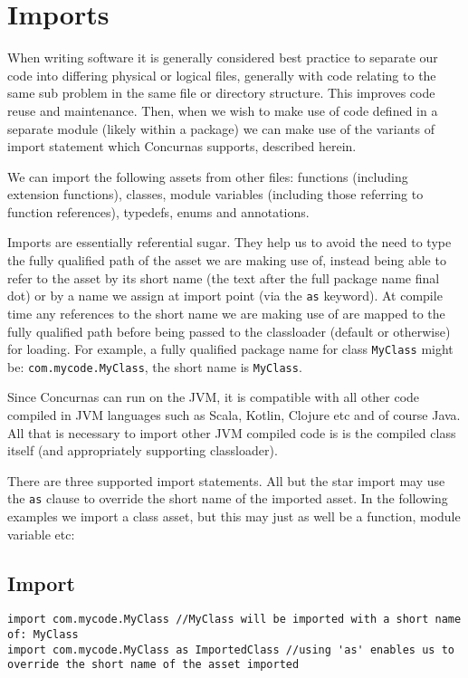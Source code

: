 \documentclass[conc-doc]{subfiles}
\begin{document}
	\chapter[Imports]{Imports}
	\label{chap:imports}

When writing software it is generally considered best practice to separate our code into differing physical or logical files, generally with code relating to the same sub problem in the same file or directory structure. This improves code reuse and maintenance. Then, when we wish to make use of code defined in a separate module (likely within a package) we can make use of the variants of import statement which Concurnas supports, described herein.

We can import the following assets from other files: functions (including extension functions), classes, module variables (including those referring to function references), typedefs, enums and annotations.

Imports are essentially referential sugar. They help us to avoid the need to type the fully qualified path of the asset we are making use of, instead being able to refer to the asset by its short name (the text after the full package name final dot) or by a name we assign at import point (via the \lstinline{as} keyword). At compile time any references to the short name we are making use of are mapped to the fully qualified path before being passed to the classloader (default or otherwise) for loading. For example, a fully qualified package name for class \lstinline{MyClass} might be: \lstinline{com.mycode.MyClass}, the short name is \lstinline{MyClass}.

Since Concurnas can run on the JVM, it is compatible with all other code compiled in JVM languages such as Scala, Kotlin, Clojure etc and of course Java. All that is necessary to import other JVM compiled code is is the compiled class itself (and appropriately supporting classloader).

There are three supported import statements. All but the star import may use the \lstinline{as} clause to override the short name of the imported asset. In the following examples we import a class asset, but this may just as well be a function, module variable etc:

\section{Import}
\begin{lstlisting}
import com.mycode.MyClass //MyClass will be imported with a short name of: MyClass
import com.mycode.MyClass as ImportedClass //using 'as' enables us to override the short name of the asset imported
\end{lstlisting}
\end{document}

